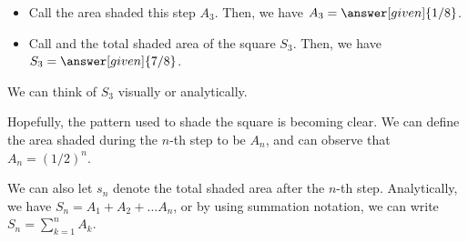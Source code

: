 \documentclass{ximera}
\begin{document}
\begin{example}
\begin{image}[1in]
\begin{tikzpicture}[scale=3,rounded corners=.5pt]
  \end{tikzpicture}
\end{image}

\begin{itemize}
\item Call the area shaded this step $A_3$.  Then, we have $A_3=\answer[given]{1/8}$.
\item Call and the total shaded area  of the square $S_3$.  Then, we have $S_3=\answer[given]{7/8}$.
\end{itemize}

We can think of $S_3$ visually or analytically. 



% 
% 
%   
%

\vspace{3mm}

Hopefully, the pattern used to shade the square is becoming clear.  We can define the area  shaded during the $n$-th step to be $A_n$, and can observe that $A_n=(1/2)^n$.

We can also let $s_n$ denote the total shaded area after the $n$-th step.  Analytically, we have $S_n = A_1+A_2 + \ldots A_n$, or by using summation notation, we can write $\displaystyle S_n = \sum_{k=1}^n A_k$.


\end{example}
\end{document}
